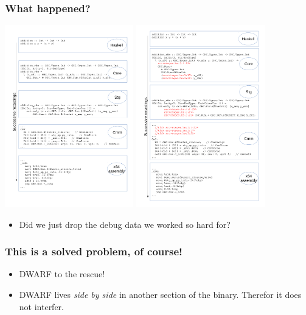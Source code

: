 \documentclass[11pt]{beamer} %
\begin{document}
  \begin{frame}
   \frametitle{What happened?}
   \includegraphics[trim=0 0.5in 0 7.8in, clip=true, width=2.2in]{fig/recastings}
   \includegraphics[trim=0 0 0 8.5in, clip=true, width=2.2in]{fig/recastings_ticks}
  \begin{itemize}
   \item Did we just drop the debug data we worked so hard for?
  \end{itemize}
  \end{frame}

  \begin{frame}
   \frametitle{This is a solved problem, of course!}
  \begin{itemize}
   \item <1-> DWARF to the rescue!
    \dwarfCode
   \item <2-> DWARF lives \emph{side by side} in another section of the binary.
     Therefor it does not interfer.
  \end{itemize}
  \end{frame}
\end{document}
